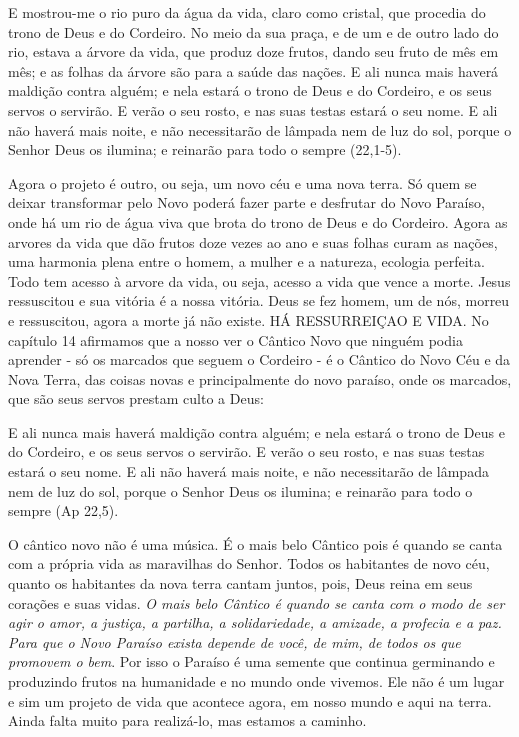 \documentclass[
]{book}
\begin{document}
E mostrou-me o rio puro da água da vida, claro como cristal, que procedia do trono de Deus e do Cordeiro. No meio da sua praça, e de um e de outro lado do rio, estava a árvore da vida, que produz doze frutos, dando seu fruto de mês em mês; e as folhas da árvore são para a saúde das nações. E ali nunca mais haverá maldição contra alguém; e nela estará o trono de Deus e do Cordeiro, e os seus servos o servirão. E verão o seu rosto, e nas suas testas estará o seu nome. E ali não haverá mais noite, e não necessitarão de lâmpada nem de luz do sol, porque o Senhor Deus os ilumina; e reinarão para todo o sempre (22,1-5).

Agora o projeto é outro, ou seja, um novo céu e uma nova terra. Só quem se deixar transformar pelo Novo poderá fazer parte e desfrutar do Novo Paraíso, onde há um rio de água viva que brota do trono de Deus e do Cordeiro. Agora as arvores da vida que dão frutos doze vezes ao ano e suas folhas curam as nações, uma harmonia plena entre o homem, a mulher e a natureza, ecologia perfeita. Todo tem acesso à arvore da vida, ou seja, acesso a vida que vence a morte. Jesus ressuscitou e sua vitória é a nossa vitória. Deus se fez homem, um de nós, morreu e ressuscitou, agora a morte já não existe. HÁ RESSURREIÇAO E VIDA. No capítulo 14 afirmamos que a nosso ver o Cântico Novo que ninguém podia aprender - só os marcados que seguem o Cordeiro - é o Cântico do Novo Céu e da Nova Terra, das coisas novas e principalmente do novo paraíso, onde os marcados, que são seus servos prestam culto a Deus:

E ali nunca mais haverá maldição contra alguém; e nela estará o trono de Deus e do Cordeiro, e os seus servos o servirão. E verão o seu rosto, e nas suas testas estará o seu nome. E ali não haverá mais noite, e não necessitarão de lâmpada nem de luz do sol, porque o Senhor Deus os ilumina; e reinarão para todo o sempre (Ap 22,5).

O cântico novo não é uma música. É o mais belo Cântico pois é quando se canta com a própria vida as maravilhas do Senhor. Todos os habitantes de novo céu, quanto os habitantes da nova terra cantam juntos, pois, Deus reina em seus corações e suas vidas. \emph{O mais belo Cântico é quando se canta com o modo de ser agir o amor, a justiça, a partilha, a solidariedade, a amizade, a profecia e a paz. Para que o Novo Paraíso exista depende de você, de mim, de todos os que promovem o bem}. Por isso o Paraíso é uma semente que continua germinando e produzindo frutos na humanidade e no mundo onde vivemos. Ele não é um lugar e sim um projeto de vida que acontece agora, em nosso mundo e aqui na terra. Ainda falta muito para realizá-lo, mas estamos a caminho.
\end{document}
